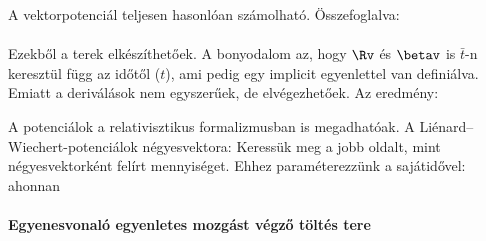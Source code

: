    A vektorpotenciál teljesen hasonlóan számolható. Összefoglalva:
   \\[6pt]
   \\[3pt]
   
   Ezekből a terek elkészíthetőek.
   A bonyodalom az, hogy $\Rv$ és $\betav$ is $\bar t$-n keresztül függ az időtől ($t$), ami pedig egy implicit egyenlettel van definiálva.
   Emiatt a deriválások nem egyszerűek, de elvégezhetőek.
   Az eredmény:
   
   A potenciálok a relativisztikus formalizmusban is megadhatóak.
   A Li\-é\-nard--Wie\-chert-po\-ten\-ci\-ál\-ok négyesvektora:
   Keressük meg a jobb oldalt, mint négyesvektorként felírt mennyiséget.
   Ehhez paraméterezzünk a sajátidővel: 
   ahonnan
   
   \paragraph{Egyenesvonaló egyenletes mozgást végző töltés tere}
    
